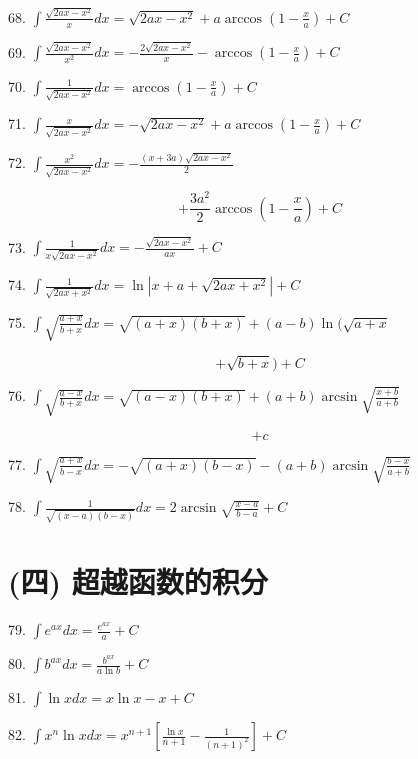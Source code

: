 \documentclass[lang=cn,newtx,10pt,scheme=chinese]{elegantbook}
\begin{document}
68. \(\int \frac{\sqrt{{2ax} - {x}^{2}}}{x}{dx} = \sqrt{{2ax} - {x}^{2}} + a\arccos \left( {1 - \frac{x}{a}}\right) + C\)

69. \(\int \frac{\sqrt{{2ax} - {x}^{2}}}{{x}^{2}}{dx} = - \frac{2\sqrt{{2ax} - {x}^{2}}}{x} - \arccos \left( {1 - \frac{x}{a}}\right) + C\)

70. \(\int \frac{1}{\sqrt{{2ax} - {x}^{2}}}{dx} = \arccos \left( {1 - \frac{x}{a}}\right) + C\)

71. \(\int \frac{x}{\sqrt{{2ax} - {x}^{2}}}{dx} = - \sqrt{{2ax} - {x}^{2}} + a\arccos \left( {1 - \frac{x}{a}}\right) + C\)

72. \(\int \frac{{x}^{2}}{\sqrt{{2ax} - {x}^{2}}}{dx} = - \frac{\left( {x + {3a}}\right) \sqrt{{2ax} - {x}^{2}}}{2}\)

\[
+ \frac{3{a}^{2}}{2}\arccos \left( {1 - \frac{x}{a}}\right) + C
\]

73. \(\int \frac{1}{x\sqrt{{2ax} - {x}^{2}}}{dx} = - \frac{\sqrt{{2ax} - {x}^{2}}}{ax} + C\)

74. \(\int \frac{1}{\sqrt{{2ax} + {x}^{2}}}{dx} = \ln \left| {x + a + \sqrt{{2ax} + {x}^{2}}}\right| + C\)

75. \(\int \sqrt{\frac{a + x}{b + x}}{dx} = \sqrt{\left( {a + x}\right) \left( {b + x}\right) } + \left( {a - b}\right) \ln (\sqrt{a + x}\)

\[
+ \sqrt{b + x}) + C
\]

76. \(\int \sqrt{\frac{a - x}{b + x}}{dx} = \sqrt{\left( {a - x}\right) \left( {b + x}\right) } + \left( {a + b}\right) \arcsin \sqrt{\frac{x + b}{a + b}}\)

\[
+ c
\]

77. \(\int \sqrt{\frac{a + x}{b - x}}{dx} = - \sqrt{\left( {a + x}\right) \left( {b - x}\right) } - \left( {a + b}\right) \arcsin \sqrt{\frac{b - x}{a + b}}\)

78. \(\int \frac{1}{\sqrt{\left( {x - a}\right) \left( {b - x}\right) }}{dx} = 2\arcsin \sqrt{\frac{x - a}{b - a}} + C\)

\section*{(四) 超越函数的积分}

79. \(\int {e}^{ax}{dx} = \frac{{e}^{ax}}{a} + C\)

80. \(\int {b}^{ax}{dx} = \frac{{b}^{ax}}{a\ln b} + C\)

81. \(\int \ln {xdx} = x\ln x - x + C\)

82. \(\int {x}^{n}\ln {xdx} = {x}^{n + 1}\left\lbrack {\frac{\ln x}{n + 1} - \frac{1}{{\left( n + 1\right) }^{2}}}\right\rbrack + C\)
\end{document}
